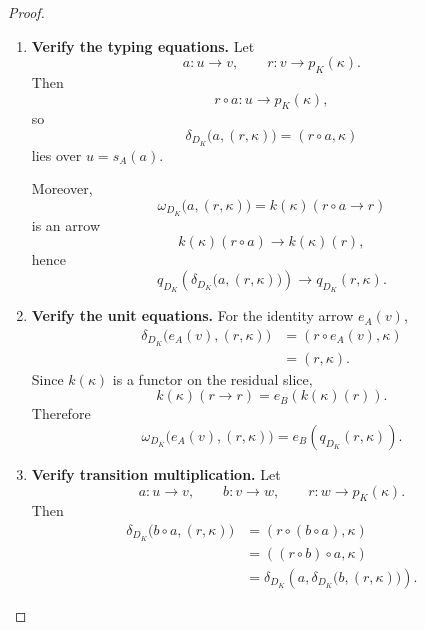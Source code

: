 \begin{proof}
    \leavevmode
    \begin{enumerate}
        \item \textbf{Verify the typing equations.}
        Let
        \[
            a:u\to v,
            \qquad
            r:v\to p_K(\kappa).
        \]
        Then
        \[
            r\circ a:u\to p_K(\kappa),
        \]
        so
        \[
            \delta_{D_K}
            \bigl(
                a,(r,\kappa)
            \bigr)
            =
            (r\circ a,\kappa)
        \]
        lies over \(u=s_A(a)\).

        Moreover,
        \[
            \omega_{D_K}
            \bigl(
                a,(r,\kappa)
            \bigr)
            =
            k(\kappa)(r\circ a\to r)
        \]
        is an arrow
        \[
            k(\kappa)(r\circ a)
            \to
            k(\kappa)(r),
        \]
        hence
        \[
            q_{D_K}
            \left(
                \delta_{D_K}
                \bigl(
                    a,(r,\kappa)
                \bigr)
            \right)
            \to
            q_{D_K}(r,\kappa).
        \]

        \item \textbf{Verify the unit equations.}
        For the identity arrow \(e_A(v)\),
        \[
        \begin{aligned}
            \delta_{D_K}
            \bigl(
                e_A(v),(r,\kappa)
            \bigr)
            &=
            (r\circ e_A(v),\kappa)
            \\
            &=
            (r,\kappa).
        \end{aligned}
        \]
        Since \(k(\kappa)\) is a functor on the residual slice,
        \[
            k(\kappa)(r\to r)
            =
            e_B(k(\kappa)(r)).
        \]
        Therefore
        \[
            \omega_{D_K}
            \bigl(
                e_A(v),(r,\kappa)
            \bigr)
            =
            e_B(q_{D_K}(r,\kappa)).
        \]

        \item \textbf{Verify transition multiplication.}
        Let
        \[
            a:u\to v,
            \qquad
            b:v\to w,
            \qquad
            r:w\to p_K(\kappa).
        \]
        Then
        \[
        \begin{aligned}
            \delta_{D_K}
            \bigl(
                b\circ a,(r,\kappa)
            \bigr)
            &=
            (r\circ(b\circ a),\kappa)
            \\
            &=
            ((r\circ b)\circ a,\kappa)
            \\
            &=
            \delta_{D_K}
            \left(
                a,
                \delta_{D_K}
                \bigl(
                    b,(r,\kappa)
                \bigr)
            \right).
        \end{aligned}
        \]


\end{enumerate}
\end{proof}
